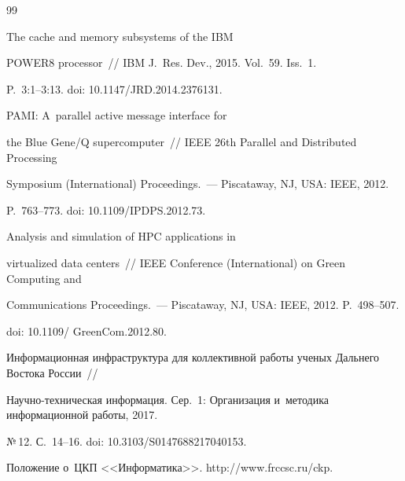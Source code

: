 {{\begin{thebibliography}{99}


 The cache and memory subsystems of the IBM 


POWER8 processor~/\!\!/ IBM J.~Res. Dev., 2015. Vol.~59. Iss.~1.  


P.~3:1--3:13. doi: 10.1147\!/\!JRD.2014.2376131.




 PAMI: A~parallel active message interface for 


the Blue Gene\!/\!Q supercomputer~/\!\!/ IEEE 26th  Parallel and Distributed Processing 


Symposium (International) Proceedings.~--- Piscataway, NJ, USA: IEEE, 2012. 


P.~763--773. doi: 10.1109\!/\!IPDPS.2012.73.




 Analysis and simulation of HPC applications in 


virtualized data centers~/\!\!/ IEEE  Conference (International) on Green Computing and 


Communications Proceedings.~--- Piscataway, NJ, USA: IEEE, 2012. P.~498--507.  


doi: 10.1109\!/ GreenCom.2012.80.






Информационная инфраструктура для коллективной работы ученых Дальнего Востока России~/\!\!/  


  На\-уч\-но-тех\-ни\-че\-ская информация. Сер.~1: Организация и~методика информационной работы, 2017. 


№\,12. С.~14--16. doi: 10.3103\!/\!S0147688217040153.







Положение о~ЦКП <<Информатика>>. \textsf{http://www.frccsc.ru/ckp}.





\end{thebibliography}


} }








